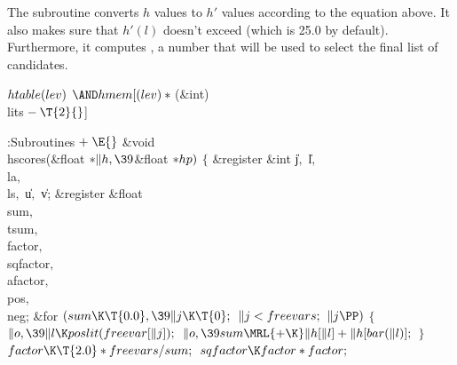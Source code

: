 The subroutine  converts $h$ values to $h'$
values according
to the equation above. It also makes sure that $h'(l)$ doesn't
exceed  (which is 25.0 by default). Furthermore, it computes
, a number
that will be used to select
the final list of candidates.

\Y\B\4\D$\\{htable}(\\{lev})$ \5
${\AND}\\{hmem}[(\\{lev})*{}$(\&{int}) \\{lits}${}-\T{2}{}$]\par
\Y\B\4:Subroutines\X${}\mathrel+\E{}$\6
\&{void} \\{hscores}(\&{float} ${}{*}\|h,\39{}$\&{float} ${}{*}\\{hp}){}$\1\1\2%
\2\6
${}\{{}$\1\6
\&{register} \&{int} \|j${},{}$ \|l${},{}$ \\{la}${},{}$ \\{ls}${},{}$ %
\|u${},{}$ \|v;\6
\&{register} \&{float} \\{sum}${},{}$ \\{tsum}${},{}$ \\{factor}${},{}$ %
\\{sqfactor}${},{}$ \\{afactor}${},{}$ \\{pos}${},{}$ \\{neg};\7
\&{for} ${}(\\{sum}\K\T{0.0},\39\|j\K\T{0};{}$ ${}\|j<\\{freevars};{}$ ${}\|j%
\PP){}$\5
${}\{{}$\1\6
${}\|o,\39\|l\K\\{poslit}(\\{freevar}[\|j]);{}$\6
${}\|o,\39\\{sum}\MRL{+{\K}}\|h[\|l]+\|h[\\{bar}(\|l)];{}$\6
\4${}\}{}$\2\6
${}\\{factor}\K\T{2.0}*\\{freevars}/\\{sum};{}$\6
${}\\{sqfactor}\K\\{factor}*\\{factor};{}$\6
